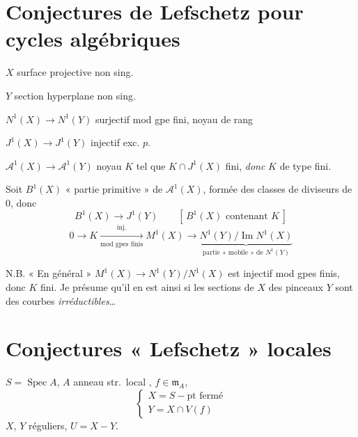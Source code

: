 \documentclass[11pt,a4paper]{article}
\begin{document}
\section{Conjectures de Lefschetz pour cycles algébriques}


$X$ surface projective non sing.

$Y$ section hyperplane non sing.

$N^{1}(X) \to N^{1}(Y)$ \quad surjectif mod gpe fini, noyau de rang

$J^{1}(X) \to J^{1}(Y)$ \quad injectif exc. $p$.

$\mathcal{A}^{1}(X) \to \mathcal{A}^{1}(Y)$ \quad noyau $K$ tel que
$K \cap J^{1}(X)$ fini, \emph{donc} $K$ de type fini.

Soit $B^{1}(X)$ « partie primitive » de $\mathcal{A}^{1}(X)$, formée des
classes de diviseurs de  $0$, donc
\[
B^{1}(X) \longrightarrow J^{1}(Y) \qquad [\,B^{1}(X) \text{ contenant } K\,]
\]
\[
0 \to K \xrightarrow[\text{mod gpes finis}]{\text{inj.}} M^{1}(X) \longrightarrow
\underbrace{N^{1}(Y)/\operatorname{Im} N^{1}(X)}_{\text{partie « mobile » de } N^{1}(Y)}
\]


N.B. « En général » $M^{1}(X) \to N^{1}(Y)/N^{1}(X)$ est injectif mod gpes
finis, donc $K$ fini. Je présume qu'il en est ainsi si les sections
 de $X$ des  pinceaux
 $Y$ sont des courbes \emph{irréductibles}…

\section{Conjectures « Lefschetz » locales}


$S = \operatorname{Spec} A$, \quad $A$ anneau str.\ local ,
$f \in \mathfrak{m}_{A}$,
\[
\begin{cases}
X = S - \text{pt fermé} \\
Y = X \cap V(f)
\end{cases}
\]
$X$, $Y$ réguliers, \quad $U = X - Y$.
\end{document}
